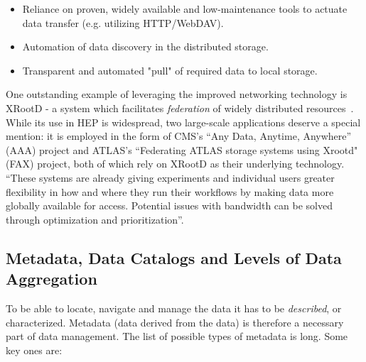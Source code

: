\begin{itemize}
	\item Reliance on proven, widely available and low-maintenance tools to actuate data transfer (e.g. utilizing HTTP/WebDAV).
	\item Automation of data discovery in the distributed storage.
	\item Transparent and automated "pull" of required data to local storage.
\end{itemize}

One outstanding example of leveraging the improved networking technology is XRootD - a system which facilitates \textit{federation} of widely 
distributed resources~\cite{xrootd_fed,xrootd_snowmass}. While its use in HEP is widespread, two large-scale applications deserve a special mention: 
it is employed  in the form of CMS's ``Any Data, Anytime, Anywhere'' (AAA)
project and ATLAS's ``Federating ATLAS storage systems using Xrootd" (FAX) project, both of which rely
on XRootD as their underlying technology. ``These systems are already giving experiments and
individual users greater flexibility in how and where they run their workflows by making data more globally
available for access. Potential issues with bandwidth can be solved through optimization and prioritization''\cite{xrootd_snowmass}.


\subsection{Metadata, Data Catalogs and Levels of Data Aggregation}
To be able to locate, navigate and manage the data it has to be \textit{described}, or characterized. Metadata (data derived from the data) is
therefore a necessary part of data management. The  list of possible types of metadata is long. Some key ones are:

